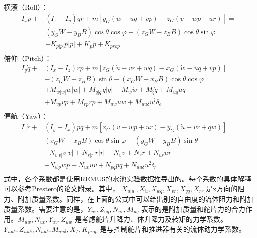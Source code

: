 横滚（Roll）：
\begin{equation}
\label{eq:chap2:rollremus}
\begin{aligned}
 {I_x}\dot p + &({I_z} - {I_y})qr + m[{y_G}(\dot w - uq + vp) - {z_G}(\dot v - wp + ur)] = \\
 &({y_G}W - {y_B}B)\cos \theta \cos \varphi  - ({z_G}W - {z_B}B)\cos \theta \sin \varphi \\
 & + {K_{p\left| p \right|}}p\left| p \right| + {K_{\dot p}}\dot p + {K_{prop}}  \\
\end{aligned}
\end{equation}
俯仰（Pitch）：
\begin{equation}
\label{eq:chap2:pitchremus}
\begin{aligned}
 {I_y}\dot q + &({I_x} - {I_z})rp + m[{z_G}(\dot u - vr + wq) - {x_G}(\dot w - uq + vp)] = \\
 &- ({z_G}W - {z_B}B)\sin \theta  - ({x_G}W - {x_B}B)\cos \theta \cos \varphi  \\
 &+ {M_{w\left| w \right|}}w\left| w \right| + {M_{q\left| q \right|}}q\left| q \right|
  + {M_{\dot w}}\dot w + {M_{\dot q}}\dot q  + {M_{uq}}uq \\
   &+ {M_{vp}}vp +{M_{rp}}rp + {M_{uw}}uw + {M_{uu\delta }}{u^2}{\delta _e} \\
\end{aligned}
\end{equation}
偏航（Yaw）：
\begin{equation}
\label{eq:chap2:yawremus}
\begin{aligned}
 {I_z}\dot r + &({I_y} - {I_x})pq + m[{x_G}(\dot v - wp + ur) - {y_G}(\dot u - vr + qw)] = \\
 &({x_G}W - {x_B}B)\cos \theta \sin \varphi  - ({y_G}W - {y_B}B)\sin \theta  \\
 &  + {N_{v\left| v \right|}}v\left| v \right| + {N_{r\left| r \right|}}r\left| r \right|  + {N_{\dot v}}\dot v  + {N_{\dot r}}\dot r + {N_{ur}}ur \\
 &  + {N_{wp}}wp  + {N_{uv}}uv + {N_{pq}}pq + {N_{uu\delta }}{u^2}{\delta _r} \\
\end{aligned}
\end{equation}
式中，各个系数都是使用REMUS的水池实验数据推导出的。每个系数的具体解释可以参考Prestero的论文附录\cite{prestero2001verification}。其中， $X_{u\left| u \right|}, X_{\dot u}, X_{wq},X_{vr},X_{qq}, X_{rr}$ 是x方向的阻力、附加质量系数。同样，在上面的公式中可以给出别的自由度的流体阻力和附加质量系数。需要注意的是，$Y_{ur},Z_{uq},N_{ur},M_{uq}$ 表示的是附加质量和舵片力的合力作用。$ M_{uw},N_{uv},Y_{uv},Z_{uw}$ 是考虑舵片升降力、体升降力及转矩的力学系数。 $Y_{uu\delta },Z_{uu\delta },N_{uu\delta},M_{uu\delta },X_T,K_{prop}$ 是与控制舵片和推进器有关的流体动力学系数。

